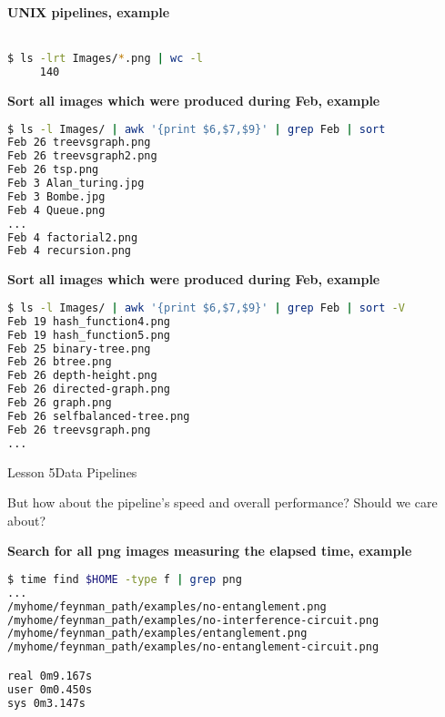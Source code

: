 \documentclass[aspectratio=1610]{beamer}
\begin{document}
\begin{frame}
\end{frame}


\begin{frame}[fragile]
\LARGE
\textbf{UNIX pipelines, example}\\~\\
\begin{lstlisting}[language=sh]
$ ls -lrt Images/*.png | wc -l
     140
\end{lstlisting}
\end{frame}


\begin{frame}[fragile]
\LARGE
\textbf{Sort all images which were produced during Feb, example}\\
\Large
\begin{lstlisting}[language=sh]
$ ls -l Images/ | awk '{print $6,$7,$9}' | grep Feb | sort
Feb 26 treevsgraph.png
Feb 26 treevsgraph2.png
Feb 26 tsp.png
Feb 3 Alan_turing.jpg
Feb 3 Bombe.jpg
Feb 4 Queue.png
...
Feb 4 factorial2.png
Feb 4 recursion.png
\end{lstlisting}
\end{frame}



\begin{frame}[fragile]
\LARGE
\textbf{Sort all images which were produced during Feb, example}\\
\Large
\begin{lstlisting}[language=sh]
$ ls -l Images/ | awk '{print $6,$7,$9}' | grep Feb | sort -V
Feb 19 hash_function4.png
Feb 19 hash_function5.png
Feb 25 binary-tree.png
Feb 26 btree.png
Feb 26 depth-height.png
Feb 26 directed-graph.png
Feb 26 graph.png
Feb 26 selfbalanced-tree.png
Feb 26 treevsgraph.png
...
\end{lstlisting}
\end{frame}


\begin{frame}{Lesson 5}{Data Pipelines}
\Huge
\begin{center}
But how about the pipeline's \alert{speed} and overall
\alert{performance}? Should we care about?
\end{center}
\end{frame}



\begin{frame}[fragile]
\LARGE
\textbf{Search for all png images measuring the elapsed time, example}\\
\Large
\begin{lstlisting}[language=sh]
$ time find $HOME -type f | grep png
...
/myhome/feynman_path/examples/no-entanglement.png
/myhome/feynman_path/examples/no-interference-circuit.png
/myhome/feynman_path/examples/entanglement.png
/myhome/feynman_path/examples/no-entanglement-circuit.png

real 0m9.167s
user 0m0.450s
sys 0m3.147s
\end{lstlisting}
\end{frame}
\end{document}
